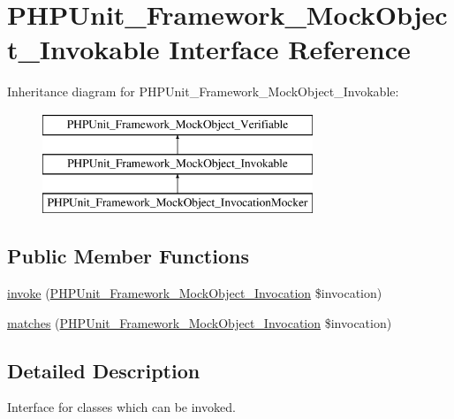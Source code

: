 \hypertarget{interface_p_h_p_unit___framework___mock_object___invokable}{}\section{P\+H\+P\+Unit\+\_\+\+Framework\+\_\+\+Mock\+Object\+\_\+\+Invokable Interface Reference}
\label{interface_p_h_p_unit___framework___mock_object___invokable}
Inheritance diagram for P\+H\+P\+Unit\+\_\+\+Framework\+\_\+\+Mock\+Object\+\_\+\+Invokable\+:\begin{figure}[H]
\begin{center}
\leavevmode
\includegraphics[height=3.000000cm]{interface_p_h_p_unit___framework___mock_object___invokable}
\end{center}
\end{figure}
\subsection*{Public Member Functions}
\begin{DoxyCompactItemize}
\item 
\mbox{\hyperlink{interface_p_h_p_unit___framework___mock_object___invokable_af2fc26e6704e08d95f2ea1d9c5ffb865}{invoke}} (\mbox{\hyperlink{interface_p_h_p_unit___framework___mock_object___invocation}{P\+H\+P\+Unit\+\_\+\+Framework\+\_\+\+Mock\+Object\+\_\+\+Invocation}} \$invocation)
\item 
\mbox{\hyperlink{interface_p_h_p_unit___framework___mock_object___invokable_a4988c6fa11e275302172d0a4ae32dd3a}{matches}} (\mbox{\hyperlink{interface_p_h_p_unit___framework___mock_object___invocation}{P\+H\+P\+Unit\+\_\+\+Framework\+\_\+\+Mock\+Object\+\_\+\+Invocation}} \$invocation)
\end{DoxyCompactItemize}


\subsection{Detailed Description}
Interface for classes which can be invoked.


